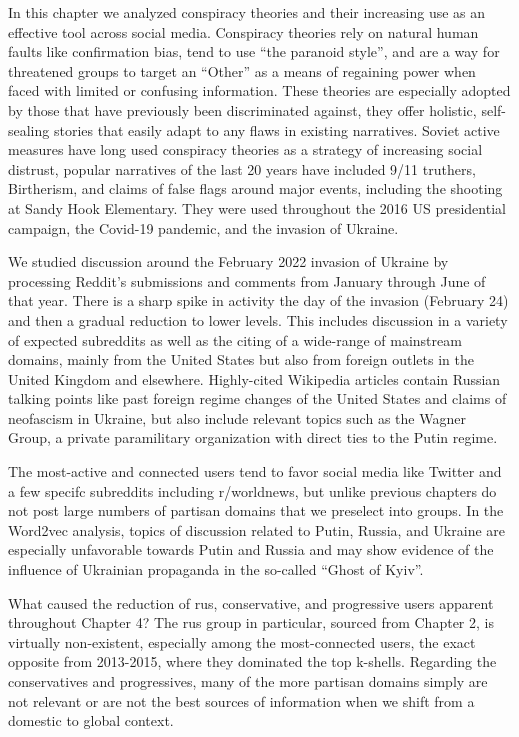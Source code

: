\documentclass[doublespacing]{utdthesis}
\begin{document}
In this chapter we analyzed conspiracy theories and their increasing use as an effective tool across social media.
Conspiracy theories rely on natural human faults like confirmation bias, tend to use ``the paranoid style'', and are a way for threatened groups to target an ``Other'' as a means of regaining power when faced with limited or confusing information.
These theories are especially adopted by those that have previously been discriminated against, they offer holistic, self-sealing stories that easily adapt to any flaws in existing narratives.
Soviet active measures have long used conspiracy theories as a strategy of increasing social distrust, popular narratives of the last 20 years have included 9/11 truthers, Birtherism, and claims of false flags around major events, including the shooting at Sandy Hook Elementary.
They were used throughout the 2016 US presidential campaign, the Covid-19 pandemic, and the invasion of Ukraine.

We studied discussion around the February 2022 invasion of Ukraine by processing Reddit's submissions and comments from January through June of that year.
There is a sharp spike in activity the day of the invasion (February 24) and then a gradual reduction to lower levels.
This includes discussion in a variety of expected subreddits as well as the citing of a wide-range of mainstream domains, mainly from the United States but also from foreign outlets in the United Kingdom and elsewhere.
Highly-cited Wikipedia articles contain Russian talking points like past foreign regime changes of the United States and claims of neofascism in Ukraine, but also include relevant topics such as the Wagner Group, a private paramilitary organization with direct ties to the Putin regime.

The most-active and connected users tend to favor social media like Twitter and a few specifc subreddits including r/worldnews, but unlike previous chapters do not post large numbers of partisan domains that we preselect into groups.
In the Word2vec analysis, topics of discussion related to Putin, Russia, and Ukraine are especially unfavorable towards Putin and Russia and may show evidence of the influence of Ukrainian propaganda in the so-called ``Ghost of Kyiv''.

What caused the reduction of rus, conservative, and progressive users apparent  throughout Chapter 4?
The rus group in particular, sourced from Chapter 2, is virtually non-existent, especially among the most-connected users, the exact opposite from 2013-2015, where they dominated the top k-shells.
Regarding the conservatives and progressives, many of the more partisan domains simply are not relevant or are not the best sources of information when we shift from a domestic to global context.
\end{document}
